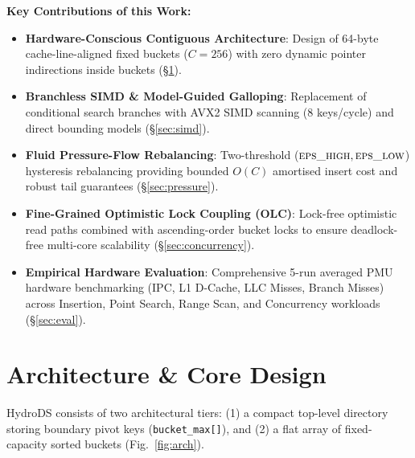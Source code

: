 \documentclass[10pt,twocolumn,letterpaper]{article}
\theoremstyle{definition}
\newcommand{\codeword}[1]{\texttt{\scriptsize #1}}
\newcommand{\epsh}{\textsc{eps\_high}}
\newcommand{\epsl}{\textsc{eps\_low}}
\begin{document}
\smallskip
\noindent\textbf{Key Contributions of this Work:}
\begin{itemize}
  \item \textbf{Hardware-Conscious Contiguous Architecture}: Design of 64-byte cache-line-aligned fixed buckets ($C{=}256$) with zero dynamic pointer indirections inside buckets (\S\ref{sec:layout}).
  \item \textbf{Branchless SIMD & Model-Guided Galloping}: Replacement of conditional search branches with AVX2 SIMD scanning (8 keys/cycle) and direct bounding models (\S\ref{sec:simd}).
  \item \textbf{Fluid Pressure-Flow Rebalancing}: Two-threshold ($\epsh, \epsl$) hysteresis rebalancing providing bounded $O(C)$ amortised insert cost and robust tail guarantees (\S\ref{sec:pressure}).
  \item \textbf{Fine-Grained Optimistic Lock Coupling (OLC)}: Lock-free optimistic read paths combined with ascending-order bucket locks to ensure deadlock-free multi-core scalability (\S\ref{sec:concurrency}).
  \item \textbf{Empirical Hardware Evaluation}: Comprehensive 5-run averaged PMU hardware benchmarking (IPC, L1 D-Cache, LLC Misses, Branch Misses) across Insertion, Point Search, Range Scan, and Concurrency workloads (\S\ref{sec:eval}).
\end{itemize}

\section{Architecture & Core Design}
\label{sec:layout}

HydroDS consists of two architectural tiers: (1) a compact top-level directory storing boundary pivot keys (\codeword{bucket\_max[]}), and (2) a flat array of fixed-capacity sorted buckets (Fig.~\ref{fig:arch}).
\end{document}

